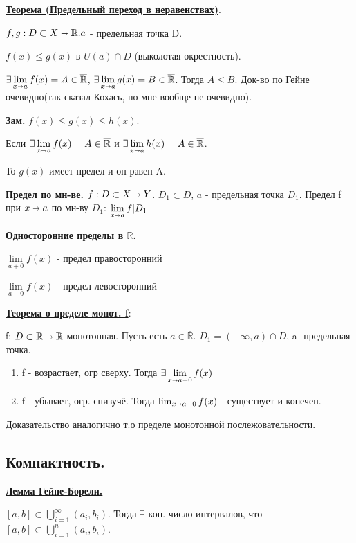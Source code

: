 \documentclass{article}
\newcommand{\deff}[1]{\underline{\textbf{#1}}}
\newcommand{\thmm}[1]{\underline{\textbf{#1}}}
\begin{document}
\thmm{Теорема (Предельный переход в неравенствах)}.

$f,g: D \subset X \shortrightarrow \mathbb{R}. a$ -  предельная точка D.

$f(x)\leq g(x) $ в $U(a) \cap D$ (выколотая окрестность). 

$\exists \lim\limits_{x\shortrightarrow a} f(x)=A \in \overline{\mathbb{R}}$,  $\exists \lim\limits_{x\shortrightarrow a} g(x)=B \in \overline{\mathbb{R}}$. Тогда $A \leq B$. Док-во по Гейне очевидно(так сказал Кохась, но мне вообще не очевидно).

\textbf{Зам.} $f(x)\leq g(x) \leq h(x)$.

Если $\exists \lim\limits_{x\shortrightarrow a} f(x)=A \in \overline{\mathbb{R}}$ и  $\exists \lim\limits_{x\shortrightarrow a} h(x)=A \in \overline{\mathbb{R}}$. 

То $g(x)$ имеет предел и он равен A.

\deff{Предел по мн-ве.} $f:D\subset X \shortrightarrow Y$. $D_1 \subset D$, $a$ - предельная точка $D_1$. Предел f при $x\shortrightarrow a$ по мн-ву $D_1$: $\lim \limits_{x\shortrightarrow a} f|D_1$

\deff{Односторонние пределы в $\mathbb{R}$.}

$\lim\limits_{a+0} f(x)$ - предел правосторонний 

$\lim\limits_{a-0} f(x)$ - предел левосторонний 

\thmm{Теорема о пределе монот. f}:

f: $D \subset \mathbb{R} \shortrightarrow \mathbb{R}$ монотонная. Пусть есть $a \in \overline{\mathbb{R}}$. $D_1 = (-\infty, a) \cap D$, a  -предельная точка.
\begin{enumerate}
    \item f - возрастает, огр сверху. Тогда $\exists \lim\limits_{x \shortrightarrow a - 0} f(x)$
    \item f - убывает, огр. снизучё. Тогда $\lim_{x\shortrightarrow a-0} f(x)$ - существует и конечен.
\end{enumerate}
Доказательство аналогично т.о пределе монотонной послежовательности.
\pagebreak
\subsection{Компактность.}

\thmm{Лемма Гейне-Борели.}

$ [a,b] \subset \bigcup\limits_{i=1}^{\infty} (a_i,b_i)$. Тогда $\exists$ кон. число интервалов, что $ [a,b] \subset \bigcup\limits_{i=1}^{n} (a_i,b_i)$.
\end{document}

